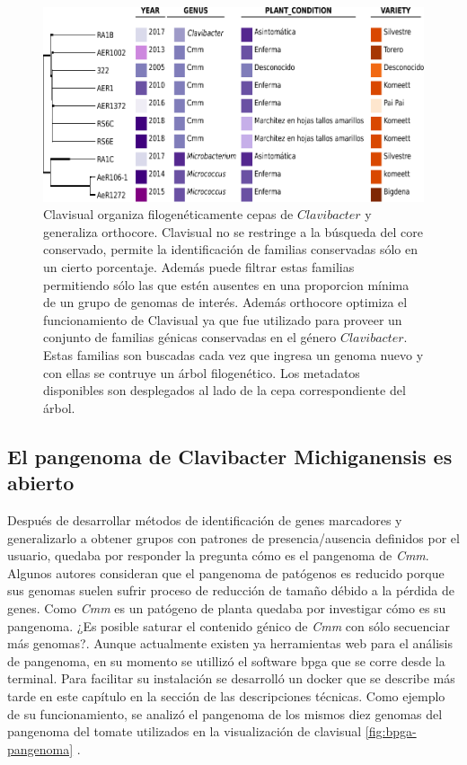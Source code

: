 \documentclass[12pt,twoside]{reedthesis}
\begin{document}
  \begin{figure}[h!tbp]
  \centering
  \includegraphics[angle = 0,scale = .7]{chapter1/Clavisual.pdf}
  \caption[Clavisual organiza cepas de $Clavibacter$ con sus metadatos. ]{\footnotesize{Clavisual organiza filogenéticamente cepas de $Clavibacter$ y generaliza orthocore. Clavisual no se restringe a la búsqueda del core conservado, permite la identificación de familias conservadas sólo en un cierto porcentaje. Además puede filtrar estas familias permitiendo sólo las que estén ausentes en una proporcion mínima de un grupo de genomas de interés. Además orthocore optimiza el funcionamiento de Clavisual ya que fue utilizado para proveer un conjunto de familias génicas conservadas en el género $Clavibacter$. Estas familias son buscadas cada vez que ingresa un genoma nuevo y con ellas se contruye un árbol filogenético. Los metadatos disponibles son desplegados al lado de la cepa correspondiente del árbol.}}
  \label{fig:Clavisual}
  \end{figure}
  
  \subsection{El pangenoma de Clavibacter Michiganensis es
  abierto}\label{el-pangenoma-de-clavibacter-michiganensis-es-abierto}
  
  Después de desarrollar métodos de identificación de genes marcadores y
  generalizarlo a obtener grupos con patrones de presencia/ausencia
  definidos por el usuario, quedaba por responder la pregunta cómo es el
  pangenoma de \emph{Cmm}. Algunos autores consideran que el pangenoma de
  patógenos es reducido porque sus genomas suelen sufrir proceso de
  reducción de tamaño débido a la pérdida de genes. Como \emph{Cmm} es un
  patógeno de planta quedaba por investigar cómo es su pangenoma. ¿Es
  posible saturar el contenido génico de \emph{Cmm} con sólo secuenciar
  más genomas?. Aunque actualmente existen ya herramientas web para el
  análisis de pangenoma, en su momento se utillizó el software bpga que se
  corre desde la terminal. Para facilitar su instalación se desarrolló un
  docker que se describe más tarde en este capítulo en la sección de las
  descripciones técnicas. Como ejemplo de su funcionamiento, se analizó el
  pangenoma de los mismos diez genomas del pangenoma del tomate utilizados
  en la visualización de clavisual \autoref{fig:bpga-pangenoma} .
  
\end{document}
